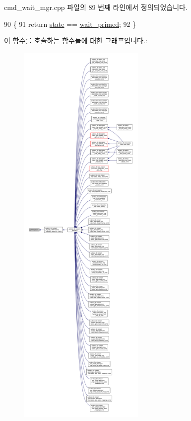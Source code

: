 cmd\+\_\+wait\+\_\+mgr.\+cpp 파일의 89 번째 라인에서 정의되었습니다.


\begin{DoxyCode}
90 \{
91     \textcolor{keywordflow}{return} \hyperlink{classavdecc__lib_1_1cmd__wait__mgr_a95d6840dec33a00d29915754985b0e94}{state} == \hyperlink{classavdecc__lib_1_1cmd__wait__mgr_a6d8ed97126bdf056391a14a921f643a8a75c6bbc9aac093b2b59ee35a49c71671}{wait\_primed};
92 \}
\end{DoxyCode}


이 함수를 호출하는 함수들에 대한 그래프입니다.\+:
\nopagebreak
\begin{figure}[H]
\begin{center}
\leavevmode
\includegraphics[height=550pt]{classavdecc__lib_1_1cmd__wait__mgr_a6c44383e58fc510f2117c67b931b22c8_icgraph}
\end{center}
\end{figure}


